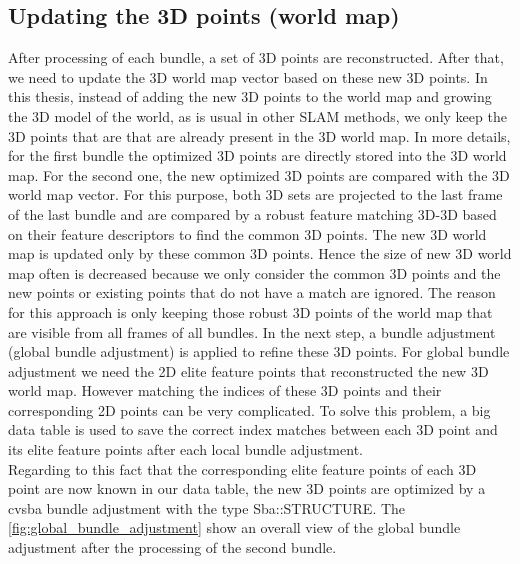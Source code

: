 \subsection{Updating the 3D points (world map)} \label{subsec:update_3d_points}
After processing of each bundle, a set of 3D points are reconstructed. After that, we need to update the 3D world map vector based on these new 3D points. In this thesis, instead of adding the new 3D points to the world map and growing the 3D model of the world, as is usual in other SLAM methods, we only keep the 3D points that are that are already present in the 3D world map. In more details, for the first bundle the optimized 3D points are directly stored into the 3D world map. For the second one, the new optimized 3D points are compared with the 3D world map vector. For this purpose, both 3D sets are projected to the last frame of the last bundle and are compared by a robust feature matching 3D-3D based on their feature descriptors to find the common 3D points. The new 3D world map is updated only by these common 3D points. Hence the size of new 3D world map often is decreased because we only consider the common 3D points and the new points or existing points that do not have a match are ignored. The reason for this approach is only keeping those robust 3D points of the world map that are visible from all frames of all bundles. 
In the next step, a bundle adjustment (global bundle adjustment) is applied to refine these 3D points. For global bundle adjustment we need the 2D elite feature points that reconstructed the new 3D world map. However matching the indices of these 3D points and their corresponding 2D points can be very complicated. To solve this problem, a big data table is used to save the correct index matches between each 3D point and its elite feature points after each local bundle adjustment.\\
Regarding to this fact that the corresponding elite feature points of each 3D point are now known in our data table, the new 3D points are optimized by a cvsba bundle adjustment with the type Sba::STRUCTURE. The \autoref{fig:global_bundle_adjustment} show an overall view of the global bundle adjustment after the processing of the second bundle.

